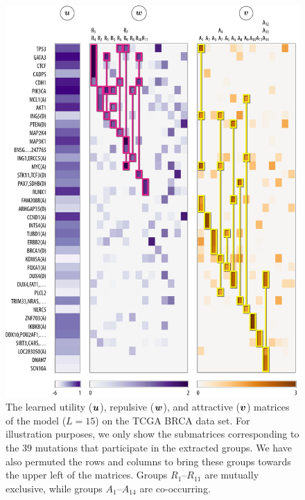 \begin{figure}[htbp]
\centering
\includegraphics[width=\textwidth]{figures/genes/mat_brca.pdf}
\caption{The learned utility ($\bm{u}$), repulsive ($\bm{w}$), and attractive ($\bm{v}$) matrices of the \fldc{} model ($L = 15$) on the TCGA BRCA data set.
For illustration purposes, we only show the submatrices corresponding to the $39$ mutations that participate in the extracted groups.
We have also permuted the rows and columns to bring these groups towards the upper left of the matrices.
Groups $R_1$--$R_{11}$ are mutually exclusive, while groups $A_1$--$A_{14}$ are co-occurring.
}
\label{fig:mat_brca}
\end{figure}

